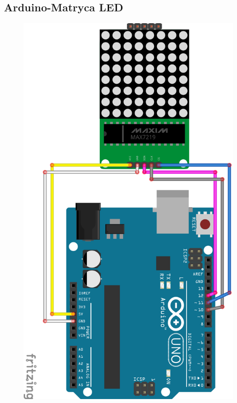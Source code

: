 \documentclass[12pt,notitlepage]{article}
\begin{document}
\subsection{Arduino-Matryca LED}
\begin{figure}[h!]
   \includegraphics[height=0.9\textheight]{schemat-plytka-matryca_bb.png}
   \centering
  \label{fig:schemat-plytka-matryca}
\end{figure}
\end{document}
